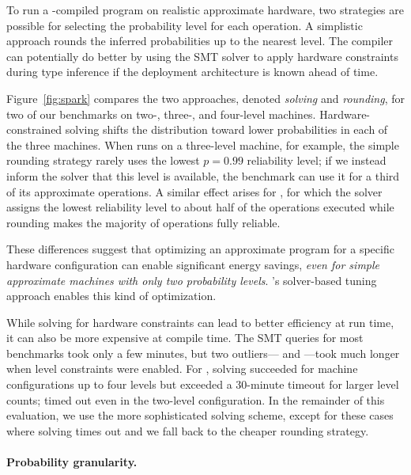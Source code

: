 {To run a \lang-compiled program on realistic approximate hardware, two
strategies are possible for selecting the probability level for each operation.
A simplistic approach rounds the inferred probabilities up to the nearest
level.
The compiler can potentially do better by using the SMT solver to apply hardware
constraints during type inference if the deployment architecture is known
ahead of time.

Figure~\ref{fig:spark} compares the two approaches, denoted \emph{solving} and
\emph{rounding},
for two of
our benchmarks on \mbox{two-,} \mbox{three-,} and four-level machines.
Hardware-constrained solving shifts the distribution toward lower
probabilities in each of the three machines.
When  runs on a three-level machine, for example, the simple
rounding strategy rarely uses the lowest $p=0.99$ reliability level;
if we instead inform the solver that this level is available, the benchmark
can use it for a third of its approximate operations.
A similar effect arises for , for which the solver assigns the
lowest reliability level to about half of the operations executed while
rounding makes the majority of operations fully reliable.

These differences suggest that optimizing an approximate program for a
specific hardware configuration can enable significant energy savings,
\emph{even for simple approximate machines with only two probability levels}.
\lang's solver-based tuning approach enables this kind of
optimization.

While solving for hardware constraints can lead to better efficiency at run
time, it can also be more expensive at compile time.
The SMT queries for most benchmarks took only a few minutes,
but two outliers--- and ---took much longer when level constraints
were enabled.
For , solving succeeded for machine configurations up to four levels
but exceeded a 30-minute timeout for larger level counts;
 timed out even in the two-level configuration.
In the remainder of this evaluation, we use the more sophisticated solving
scheme, except for these cases where solving times out and we fall back to the
cheaper rounding strategy.


\paragraph{Probability granularity.}

}
